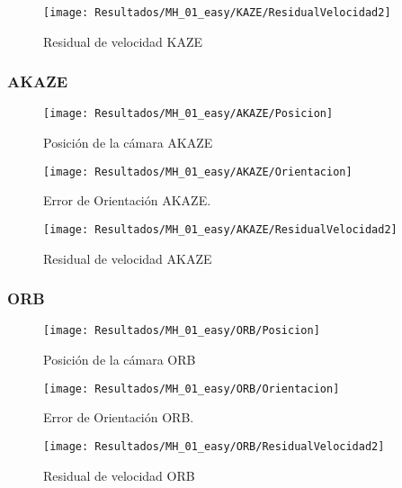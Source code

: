 \begin{figure}[H]
	\centering
	\texttt{[image: Resultados/MH\_01\_easy/KAZE/ResidualVelocidad2]}
	\caption{Residual de velocidad KAZE}
	\label{imagen:Resultados/MH_01_easy/KAZE/ResidualVelocidad}
\end{figure}



\subsubsection{AKAZE}


\begin{figure}[H]
	\centering
	\texttt{[image: Resultados/MH\_01\_easy/AKAZE/Posicion]}
	\caption{Posición de la cámara AKAZE}
	\label{imagen:Resultados/MH_01_easy/AKAZE/Posicion}
\end{figure}


\begin{figure}[H]
	\centering
	\texttt{[image: Resultados/MH\_01\_easy/AKAZE/Orientacion]}
	\caption[Error de Orientación AKAZE]{Error de Orientación AKAZE.}
	\label{imagen:Resultados/MH_01_easy/AKAZE/Orientacion}
\end{figure}



\begin{figure}[H]
	\centering
	\texttt{[image: Resultados/MH\_01\_easy/AKAZE/ResidualVelocidad2]}
	\caption{Residual de velocidad AKAZE}
	\label{imagen:Resultados/MH_01_easy/AKAZE/ResidualVelocidad}
\end{figure}

\subsubsection{ORB}


\begin{figure}[H]
	\centering
	\texttt{[image: Resultados/MH\_01\_easy/ORB/Posicion]}
	\caption{Posición de la cámara ORB}
	\label{imagen:Resultados/MH_01_easy/ORB/Posicion}
\end{figure}


\begin{figure}[H]
	\centering
	\texttt{[image: Resultados/MH\_01\_easy/ORB/Orientacion]}
	\caption[Error de Orientación ORB]{Error de Orientación ORB.}
	\label{imagen:Resultados/MH_01_easy/ORB/Orientacion}
\end{figure}
\begin{figure}[H]
	\centering
	\texttt{[image: Resultados/MH\_01\_easy/ORB/ResidualVelocidad2]}
	\caption{Residual de velocidad ORB}
	\label{imagen:Resultados/MH_01_easy/ORB/ResidualVelocidad}
\end{figure}


